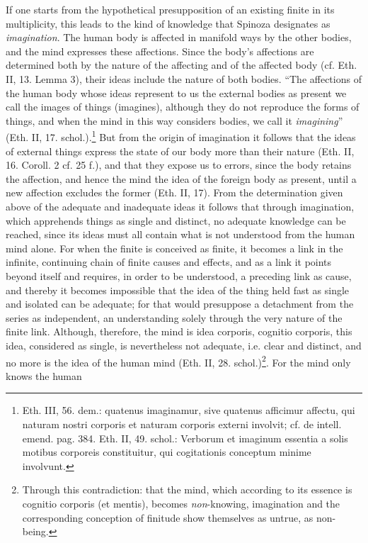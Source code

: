 \documentclass[12pt,a4paper,openany]{book}
\newcommand{\opage}[1]{\marginnote{\footnotesize\textit{[#1]}}}
\begin{document}
If one starts from the hypothetical presupposition of an
existing finite in its multiplicity, this leads to
the kind of knowledge that Spinoza designates as \emph{imagination}. The
human body is affected in manifold ways by the
other bodies, and the mind expresses these affections. Since
the body's affections are determined both by the nature of the affecting and of
the affected body (cf. Eth. II, 13. Lemma 3), their
ideas include the nature of both bodies. ``The affections
of the human body whose ideas represent to us the external
bodies as present we call the images of things (imagines),
although they do not reproduce the forms of things, and when the mind in
this way considers bodies, we call it
\emph{imagining}'' (Eth. II, 17. schol.).\footnote{Eth. III,
56. dem.: quatenus imaginamur, sive quatenus afficimur
affectu, qui naturam nostri corporis et naturam corporis
externi involvit; cf. de intell. emend. pag. 384. Eth. II,
49. schol.: Verborum et imaginum essentia a solis motibus
corporeis constituitur, qui cogitationis conceptum minime
involvunt.} But from the origin of imagination it follows that
the ideas of external things express the state of our
\opage{89}\setcounter{footnote}{0}body more than their nature (Eth. II, 16. Coroll. 2 cf. 25
f.), and that they expose us to errors, since the body retains
the affection, and hence the mind the idea of the foreign body as
present, until a new affection excludes the former (Eth. II,
17). From the determination given above of the adequate and
inadequate ideas it follows that through imagination, which
apprehends things as single and distinct, no adequate
knowledge can be reached, since its ideas must all
contain what is not understood from the human mind
alone. For when the finite is conceived as finite, it becomes
a link in the infinite, continuing chain of finite
causes and effects, and as a link it points beyond itself
and requires, in order to be understood, a preceding link as cause, and
thereby it becomes impossible that the idea of the thing held fast as single and
isolated can be adequate; for that would
presuppose a detachment from the series as independent, an
understanding solely through the very nature of the finite link. Although,
therefore, the mind is idea corporis, cognitio corporis, this
idea, considered as single, is nevertheless not adequate, i.e. clear and
distinct, and no more is the idea of the human mind
(Eth. II, 28. schol.)\footnote{Through this contradiction: that
the mind, which according to its essence is cognitio corporis (et mentis),
becomes \emph{non}-knowing, imagination and the
corresponding conception of finitude show themselves as untrue, as
non-being.}. For the mind only knows the human
\end{document}
